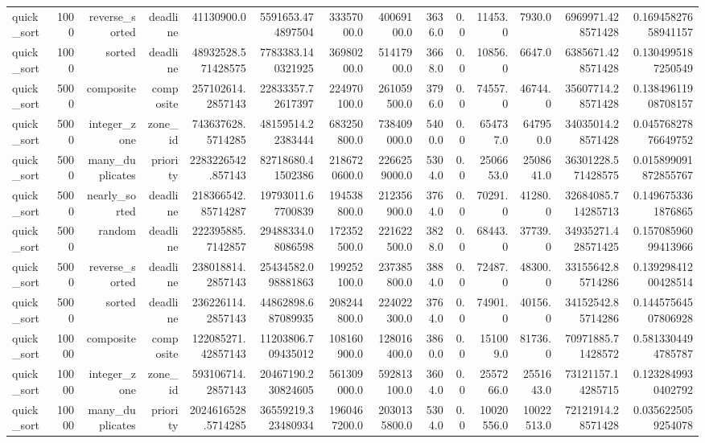 \begin{table}[htbp]
\begin{tabular}{lrrrrrrrrrrrrr}
quick_sort & 1000 & reverse_sorted & deadline & 41130900.0 & 5591653.474897504 & 33357000.0 & 40069100.0 & 3636.0 & 0.0 & 11453.0 & 7930.0 & 6969971.428571428 & 0.16945827658941157 \\
quick_sort & 1000 & sorted & deadline & 48932528.571428575 & 7783383.140321925 & 36980200.0 & 51417900.0 & 3668.0 & 0.0 & 10856.0 & 6647.0 & 6385671.428571428 & 0.1304995187250549 \\
quick_sort & 5000 & composite & composite & 257102614.2857143 & 22833357.72617397 & 224970100.0 & 261059500.0 & 3796.0 & 0.0 & 74557.0 & 46744.0 & 35607714.28571428 & 0.13849611908708157 \\
quick_sort & 5000 & integer_zone & zone_id & 743637628.5714285 & 48159514.22383444 & 683250800.0 & 738409000.0 & 5400.0 & 0.0 & 654737.0 & 647950.0 & 34035014.28571428 & 0.04576827876649752 \\
quick_sort & 5000 & many_duplicates & priority & 2283226542.857143 & 82718680.41502386 & 2186720600.0 & 2266259000.0 & 5304.0 & 0.0 & 2506653.0 & 2508641.0 & 36301228.571428575 & 0.015899091872855767 \\
quick_sort & 5000 & nearly_sorted & deadline & 218366542.85714287 & 19793011.67700839 & 194538800.0 & 212356900.0 & 3764.0 & 0.0 & 70291.0 & 41280.0 & 32684085.714285713 & 0.1496753361876865 \\
quick_sort & 5000 & random & deadline & 222395885.7142857 & 29488334.08086598 & 172352500.0 & 221622500.0 & 3828.0 & 0.0 & 68443.0 & 37739.0 & 34935271.428571425 & 0.15708596099413966 \\
quick_sort & 5000 & reverse_sorted & deadline & 238018814.2857143 & 25434582.098881863 & 199252100.0 & 237385800.0 & 3884.0 & 0.0 & 72487.0 & 48300.0 & 33155642.85714286 & 0.13929841200428514 \\
quick_sort & 5000 & sorted & deadline & 236226114.2857143 & 44862898.687089935 & 208244800.0 & 224022300.0 & 3764.0 & 0.0 & 74901.0 & 40156.0 & 34152542.85714286 & 0.14457564507806928 \\
quick_sort & 10000 & composite & composite & 122085271.42857143 & 11203806.709435012 & 108160900.0 & 128016400.0 & 3860.0 & 0.0 & 151009.0 & 81736.0 & 70971885.71428572 & 0.5813304494785787 \\
quick_sort & 10000 & integer_zone & zone_id & 593106714.2857143 & 20467190.230824605 & 561309000.0 & 592813100.0 & 3604.0 & 0.0 & 2557266.0 & 2551643.0 & 73121157.14285715 & 0.1232849930402792 \\
quick_sort & 10000 & many_duplicates & priority & 2024616528.5714285 & 36559219.323480934 & 1960467200.0 & 2030135800.0 & 5304.0 & 0.0 & 10020556.0 & 10022513.0 & 72121914.28571428 & 0.0356225059254078 \\

\end{tabular}
\end{table}
